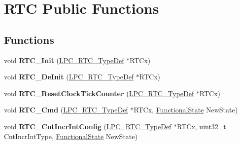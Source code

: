 \hypertarget{group___r_t_c___public___functions}{\section{\-R\-T\-C \-Public \-Functions}
\label{group___r_t_c___public___functions}
}
\subsection*{\-Functions}
\begin{DoxyCompactItemize}
\item 
\hypertarget{group___r_t_c___public___functions_ga0583738f659536f3ac52b071a17431e3}{void {\bfseries \-R\-T\-C\-\_\-\-Init} (\hyperlink{struct_l_p_c___r_t_c___type_def}{\-L\-P\-C\-\_\-\-R\-T\-C\-\_\-\-Type\-Def} $\ast$\-R\-T\-Cx)}\label{group___r_t_c___public___functions_ga0583738f659536f3ac52b071a17431e3}

\item 
\hypertarget{group___r_t_c___public___functions_ga248ec0a25c6810638265180ba51136f6}{void {\bfseries \-R\-T\-C\-\_\-\-De\-Init} (\hyperlink{struct_l_p_c___r_t_c___type_def}{\-L\-P\-C\-\_\-\-R\-T\-C\-\_\-\-Type\-Def} $\ast$\-R\-T\-Cx)}\label{group___r_t_c___public___functions_ga248ec0a25c6810638265180ba51136f6}

\item 
\hypertarget{group___r_t_c___public___functions_ga00e19c7fd749757068477cff1e31e71f}{void {\bfseries \-R\-T\-C\-\_\-\-Reset\-Clock\-Tick\-Counter} (\hyperlink{struct_l_p_c___r_t_c___type_def}{\-L\-P\-C\-\_\-\-R\-T\-C\-\_\-\-Type\-Def} $\ast$\-R\-T\-Cx)}\label{group___r_t_c___public___functions_ga00e19c7fd749757068477cff1e31e71f}

\item 
\hypertarget{group___r_t_c___public___functions_gabf88860dc8904a4aaab98ac16546068c}{void {\bfseries \-R\-T\-C\-\_\-\-Cmd} (\hyperlink{struct_l_p_c___r_t_c___type_def}{\-L\-P\-C\-\_\-\-R\-T\-C\-\_\-\-Type\-Def} $\ast$\-R\-T\-Cx, \hyperlink{group___l_p_c___types___public___types_gac9a7e9a35d2513ec15c3b537aaa4fba1}{\-Functional\-State} \-New\-State)}\label{group___r_t_c___public___functions_gabf88860dc8904a4aaab98ac16546068c}

\item 
\hypertarget{group___r_t_c___public___functions_ga2e032c1e7fc14513605852b1be814f80}{void {\bfseries \-R\-T\-C\-\_\-\-Cnt\-Incr\-Int\-Config} (\hyperlink{struct_l_p_c___r_t_c___type_def}{\-L\-P\-C\-\_\-\-R\-T\-C\-\_\-\-Type\-Def} $\ast$\-R\-T\-Cx, uint32\-\_\-t \-Cnt\-Incr\-Int\-Type, \hyperlink{group___l_p_c___types___public___types_gac9a7e9a35d2513ec15c3b537aaa4fba1}{\-Functional\-State} \-New\-State)}\label{group___r_t_c___public___functions_ga2e032c1e7fc14513605852b1be814f80}


\end{DoxyCompactItemize}
